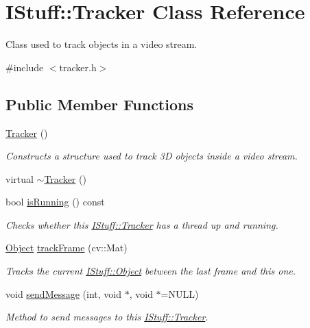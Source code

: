 \hypertarget{class_i_stuff_1_1_tracker}{\section{I\-Stuff\-:\-:Tracker Class Reference}
\label{class_i_stuff_1_1_tracker}
}


Class used to track objects in a video stream.  




{\ttfamily \#include $<$tracker.\-h$>$}

\subsection*{Public Member Functions}
\begin{DoxyCompactItemize}
\item 
\hyperlink{class_i_stuff_1_1_tracker_adf214393a14e8bf23de2fc8231e239ec}{Tracker} ()
\begin{DoxyCompactList}\small\item\em Constructs a structure used to track 3\-D objects inside a video stream. \end{DoxyCompactList}\item 
virtual \hyperlink{class_i_stuff_1_1_tracker_a0ed1e23312cfe7fcfe5f2ac2abd69163}{$\sim$\-Tracker} ()
\item 
bool \hyperlink{class_i_stuff_1_1_tracker_adeaab8820045251bcf5a7b4f394eb568}{is\-Running} () const 
\begin{DoxyCompactList}\small\item\em Checks whether this \hyperlink{class_i_stuff_1_1_tracker}{I\-Stuff\-::\-Tracker} has a thread up and running. \end{DoxyCompactList}\item 
\hyperlink{class_i_stuff_1_1_object}{Object} \hyperlink{class_i_stuff_1_1_tracker_ae2ed3c100de7c3a58484628c748c926c}{track\-Frame} (cv\-::\-Mat)
\begin{DoxyCompactList}\small\item\em Tracks the current \hyperlink{class_i_stuff_1_1_object}{I\-Stuff\-::\-Object} between the last frame and this one. \end{DoxyCompactList}\item 
void \hyperlink{class_i_stuff_1_1_tracker_a931b4e57f59d6a0f38d78bb34ab2332b}{send\-Message} (int, void $\ast$, void $\ast$=N\-U\-L\-L)
\begin{DoxyCompactList}\small\item\em Method to send messages to this \hyperlink{class_i_stuff_1_1_tracker}{I\-Stuff\-::\-Tracker}. \end{DoxyCompactList}\end{DoxyCompactItemize}
